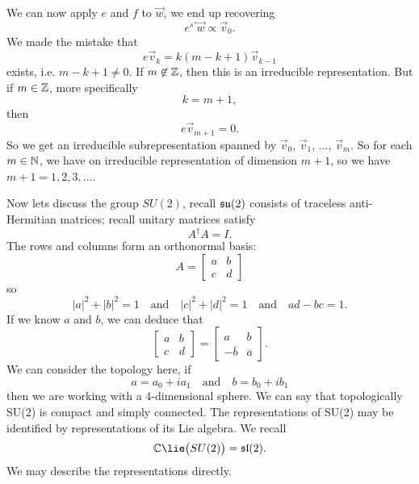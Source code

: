 We can now apply $e$ and $f$ to $\vec{w}$, we end up recovering
\begin{equation}
e^{s'}\vec{w}\propto\vec{v}_{0}.
\end{equation}
We made the mistake that
\begin{equation}
e\vec{v}_{k}=k(m-k+1)\vec{v}_{k-1}
\end{equation}
exists, i.e. $m-k+1\not=0$. If $m\not\in\Bbb{Z}$, then this is an
irreducible representation. But if $m\in\Bbb{Z}$, more
specifically
\begin{equation}
k=m+1,
\end{equation}
then
\begin{equation}
e\vec{v}_{m+1}=0.
\end{equation}
So we get an irreducible subrepresentation spanned by
$\vec{v}_{0}$, $\vec{v}_{1}$, ..., $\vec{v}_{m}$. So for each
$m\in\Bbb{N}$, we have on irreducible representation of dimension
$m+1$, so we have $m+1=1,2,3,...$.

Now lets discuss the group $SU(2)$, recall $\frak{su}(2)$
consists of traceless anti-Hermitian matrices; recall unitary
matrices satisfy
\begin{equation}
A^{\dagger}A=I.
\end{equation}
The rows and columns form an orthonormal basis:
\begin{equation}
A = \begin{bmatrix}a&b\\c&d\end{bmatrix}
\end{equation}
so
\begin{equation}
|a|^{2}+|b|^{2}=1\quad\mbox{and}\quad|c|^{2}+|d|^{2}=1\quad\mbox{and}\quad ad-bc=1.
\end{equation}
If we know $a$ and $b$, we can deduce that
\begin{equation}
\begin{bmatrix}
a&b\\c&d
\end{bmatrix}=
\begin{bmatrix}
a&b\\
-\overline{b}&\overline{a}
\end{bmatrix}.
\end{equation}
We can consider the topology here, if
\begin{equation}
a=a_{0}+ia_{1}\quad\mbox{and}\quad b=b_{0}+ib_{1}
\end{equation}
then we are working with a 4-dimensional sphere. We can say that
topologically SU(2) is compact and simply connected. The
representations of SU(2) may be identified by representations of
its Lie algebra. We recall
\begin{equation}
\Bbb{C}\lie\big(SU(2)\big)=\frak{sl}(2).
\end{equation}
We may describe the representations directly.

